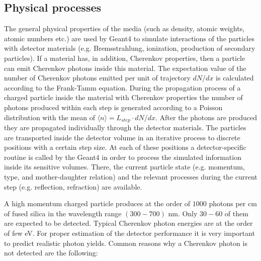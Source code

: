 \subsection{Physical processes}

The general physical properties of the media (such as density, atomic weights, atomic numbers etc.) are used by Geant4 to simulate interactions of the particles with detector materials (e.g. Bremsstrahlung, ionization, production of secondary particles). If a material has, in addition, Cherenkov properties, then a particle can emit Cherenkov photons inside this material. The expectation value of the number of Cherenkov photons emitted per unit of trajectory $dN/dx$ is calculated according to the Frank-Tamm equation. During the propagation process of a charged particle inside the material with Cherenkov properties the number of photons produced within each step is generated according to a Poisson distribution with the mean of $\langle n \rangle = L_{step} \cdot dN/dx$. After the photons are produced they are propagated individually through the detector materials. The particles are transported inside the detector volume in an iterative process to discrete positions with a certain step size. At each of these positions a detector-specific routine is called by the Geant4 in order to process the simulated information inside its sensitive volumes. There, the current particle state (e.g. momentum, type, and mother-daughter relation) and the relevant processes during the current step (e.g. reflection, refraction) are available.

A high momentum charged particle produces at the order of $1000$ photons per cm of fused silica in the wavelength range $(300-700)$ nm. Only $30-60$ of them are expected to be detected. Typical Cherenkov photon energies are at the order of few eV. For proper estimation of the detector performance it is very important to predict realistic photon yields. Common reasons why a Cherenkov photon is not detected are the following:

